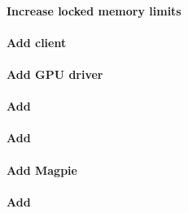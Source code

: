 \documentclass[letterpaper]{article}
\begin{document}



\paragraph{Increase locked memory limits}


\paragraph{Add \Lustre{} client}\label{sec:lustre_client}




\vspace*{0.4cm}

\paragraph{Add GPU driver}


\paragraph{Add \clustershell{}}


\paragraph{Add \genders{}}


\paragraph{Add Magpie}



\paragraph{Add \conman{}} \label{sec:add_conman}

\end{document}

